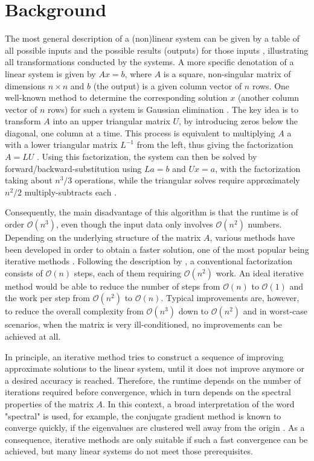 \section{Background}
\label{sec:background}

The most general description of a (non)linear system can be given by a table of all possible inputs and the possible results (outputs) for those inputs \cite{kailath_linear_1980}, illustrating all transformations conducted by the systems. A more specific denotation of a linear system is given by $Ax=b$, where $A$ is a square, non-singular matrix of dimensions $n \times n$ and $b$ (the output) is a given column vector of $n$ rows. One well-known method to determine the corresponding solution $x$ (another column vector of $n$ rows) for such a system is Gaussian elimination \cite{greenbaum_iterative_1997}. The key idea is to transform $A$ into an upper triangular matrix $U$, by introducing zeros below the diagonal, one column at a time. This process is equivalent to multiplying $A$ a with a lower triangular matrix $L^{-1}$ from the left, thus giving the factorization $A=LU$ \cite{trefethen_numerical_1997}. Using this factorization, the system can then be solved by forward/backward-substitution using $La=b$ and $Ux=a$, with the factorization taking about $n^3/3$ operations, while the triangular solves require approximately $n^2/2$ multiply-subtracts each \cite{strang_introduction_2009}.

Consequently, the main disadvantage of this algorithm is that the runtime is of order $\mathcal{O}(n^3)$, even though the input data only involves $\mathcal{O}(n^2)$ numbers. 
Depending on the underlying structure of the matrix $A$, various methods have been developed in order to obtain a faster solution, one of the most popular being iterative methods  \cite{strang_introduction_2009}. Following the description by \cite{trefethen_numerical_1997}, a conventional factorization consists of $\mathcal{O}(n)$ steps, each of them requiring $\mathcal{O}(n^2)$ work. An ideal iterative method would be able to reduce the number of steps from $\mathcal{O}(n)$ to $\mathcal{O}(1)$ and the work per step from $\mathcal{O}(n^2)$ to $\mathcal{O}(n)$. Typical improvements are, however, to reduce the overall complexity from $\mathcal{O}(n^3)$ down to $\mathcal{O}(n^2)$ and in worst-case scenarios, when the matrix is very ill-conditioned, no improvements can be achieved at all.

In principle, an iterative method tries to construct a sequence of improving approximate solutions to the linear system, until it does not improve anymore or a desired accuracy is reached. Therefore, the runtime depends on the number of iterations required before convergence, which in turn depends on the spectral properties of the matrix $A$. In this context, a broad interpretation of the word "spectral" is used, for example, the conjugate gradient method is known to converge quickly, if the eigenvalues are clustered well away from the origin \cite{trefethen_numerical_1997}. As a consequence, iterative methods are only suitable if such a fast convergence can be achieved, but many linear systems do not meet those prerequisites. 

